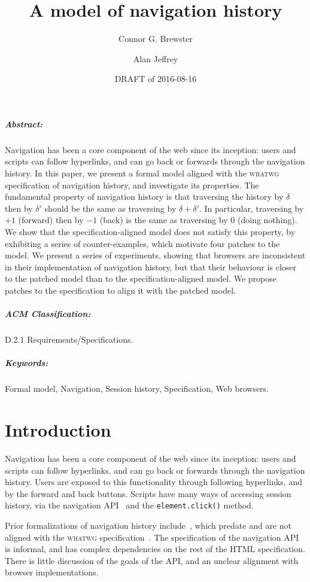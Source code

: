 \documentclass{notes}
\title{A model of navigation history}
\author{Connor G. Brewster \and Alan Jeffrey}
\date{DRAFT of 2016-08-16}
\begin{document}
\maketitle

\subparagraph{Abstract:}
Navigation has been a core component of the web since its inception:
users and scripts can follow hyperlinks, and can go back or forwards
through the navigation history. In this paper, we present a formal
model aligned with the \textsc{whatwg} specification of navigation
history, and investigate its properties. The fundamental property of
navigation history is that traversing the history by $\delta$ then by
$\delta'$ should be the same as traversing by $\delta+\delta'$. In
particular, traversing by $+1$ (forward) then by $-1$ (back) is the
same as traversing by $0$ (doing nothing). We show that the
specification-aligned model does not satisfy this property, by
exhibiting a series of counter-examples, which motivate four patches
to the model. We present a series of experiments, showing that
browsers are inconsistent in their implementation of navigation
history, but that their behaviour is closer to the patched model than
to the specification-aligned model. We propose patches to the
specification to align it with the patched model.

\subparagraph{ACM Classification:}
D.2.1 Requirements/Specifications.

\subparagraph{Keywords:}
Formal model,
Navigation,
Session history,
Specification,
Web browsers.

\section{Introduction}

Navigation has been a core component of the web since its inception:
users and scripts can follow hyperlinks, and can go back or forwards
through the navigation history. Users are exposed to this functionality
through following hyperlinks, and by the forward and back buttons.
Scripts have many ways of accessing session history, via the
navigation API~\cite[\S7.7]{whatwg} and the \verb|element.click()| method.

Prior formalizations of navigation history
include~\cite{HH:2006,Haydar:2004,HPS:2004,LHYT:2000,WP:2003}, which
predate and are not aligned with the \textsc{whatwg}
specification~\cite{whatwg}.  The specification of the navigation API
is informal, and has complex dependencies on the rest of the HTML
specification. There is little discussion of the goals
of the API, and an unclear alignment with browser implementations.
\end{document}
